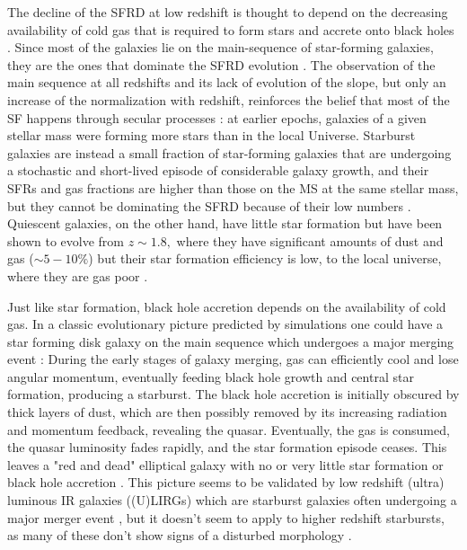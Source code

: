     The decline of the SFRD at low redshift is thought to depend on the decreasing availability of cold gas that is required to form stars and accrete onto black holes \citep[e.g.,][]{2016MNRAS.458L..14F}. Since most of the galaxies lie on the main-sequence of star-forming galaxies, they are the ones that dominate the SFRD evolution \citep{2011ApJ...739L..40R}. The observation of the main sequence at all redshifts and its lack of evolution of the slope, but only an increase of the normalization with redshift, reinforces the belief that most of the SF happens through secular processes \citep{2015A&A...581A..54T, 2015A&A...575A..74S, 2016ApJ...817..118T}: at earlier epochs, galaxies of a given stellar mass were forming more stars than in the local Universe.
    Starburst galaxies are instead a small fraction of star-forming galaxies that are undergoing a stochastic and short-lived episode of considerable galaxy growth, and their SFRs and gas fractions are higher than those on the MS at the same stellar mass, but they cannot be dominating the SFRD because of their low numbers \citep[$\sim2\%$][]{2011ApJ...739L..40R}. 
    Quiescent galaxies, on the other hand, have little star formation but have been shown to evolve from $z\sim1.8,$ where they have significant amounts of dust and gas ($\sim5-10\%$) but their star formation efficiency is low, to the local universe, where they are gas poor \citep{2018NatAs...2..239G}.
    
    Just like star formation, black hole accretion depends on the availability of cold gas. 
    In a classic evolutionary picture predicted by simulations one could have a star forming disk galaxy on the main sequence which undergoes a major merging event \citep{2005Natur.433..604D, 2008ApJS..175..356H}: During the early stages of galaxy merging, gas can efficiently cool and lose angular momentum, eventually feeding black hole growth and central star formation, producing a starburst. The black hole accretion is initially obscured by thick layers of dust, which are then possibly removed by its increasing radiation and momentum feedback, revealing the quasar. Eventually, the gas is consumed, the quasar luminosity fades rapidly, and the star formation episode ceases. This leaves a "red and dead" elliptical galaxy with no or very little star formation or black hole accretion \citep{2004ApJ...600..580G, 2006ApJ...650...42L}. This picture seems to be validated by low redshift (ultra) luminous IR galaxies ((U)LIRGs) which are starburst galaxies often undergoing a major merger event \citep{1996ARA&A..34..749S}, but it doesn't seem to apply to higher redshift starbursts, as many of these don't show signs of a disturbed morphology \citep{2007A&A...468...33E, 2019ApJ...877L..38R}. 
    
